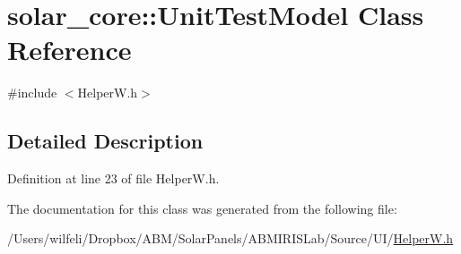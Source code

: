 \hypertarget{classsolar__core_1_1_unit_test_model}{}\section{solar\+\_\+core\+:\+:Unit\+Test\+Model Class Reference}
\label{classsolar__core_1_1_unit_test_model}


{\ttfamily \#include $<$Helper\+W.\+h$>$}



\subsection{Detailed Description}


Definition at line 23 of file Helper\+W.\+h.



The documentation for this class was generated from the following file\+:\begin{DoxyCompactItemize}
\item 
/\+Users/wilfeli/\+Dropbox/\+A\+B\+M/\+Solar\+Panels/\+A\+B\+M\+I\+R\+I\+S\+Lab/\+Source/\+U\+I/\hyperlink{_helper_w_8h}{Helper\+W.\+h}\end{DoxyCompactItemize}
